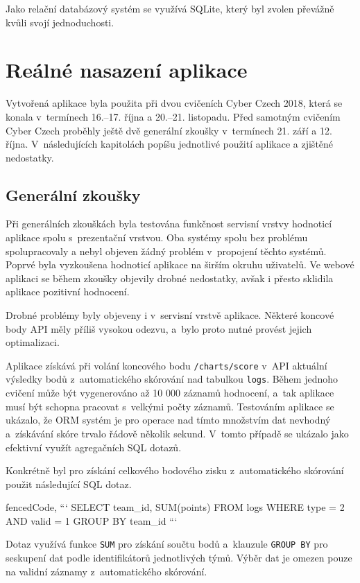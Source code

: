 \documentclass[
  digital,
  twoside,
  table, 
  nolof, 
  nolot
]{fithesis3}
\begin{document}
Jako relační databázový systém se využívá SQLite, který byl zvolen převážně kvůli svojí jednoduchosti.

\section{Reálné nasazení aplikace}

Vytvořená aplikace byla použita při dvou cvičeních Cyber Czech 2018, která se konala v~termínech 16.--17. října a 20.--21. listopadu. Před samotným cvičením Cyber Czech proběhly ještě dvě generální zkoušky v~termínech 21. září a 12. října. V~následujících kapitolách popíšu jednotlivé použití aplikace a zjištěné nedostatky.

\subsection{Generální zkoušky}
Při generálních zkouškách byla testována funkčnost servisní vrstvy hodnoticí aplikace spolu s~prezentační vrstvou. Oba systémy spolu bez problému spolupracovaly a nebyl objeven žádný problém v~propojení těchto systémů. Poprvé byla vyzkoušena hodnoticí aplikace na širším okruhu uživatelů. Ve webové aplikaci se během zkoušky objevily drobné nedostatky, avšak i přesto sklidila aplikace pozitivní hodnocení.

Drobné problémy byly objeveny i v~servisní vrstvě aplikace. Některé koncové body API měly příliš vysokou odezvu, a~bylo proto nutné provést jejich optimalizaci.

Aplikace získává při volání koncového bodu \texttt{/charts/score} v~API aktuální výsledky bodů z~automatického skórování nad tabulkou \texttt{logs}. Během jednoho cvičení může být vygenerováno až 10 000 záznamů hodnocení, a~tak aplikace musí být schopna pracovat s~velkými počty záznamů. Testováním aplikace se ukázalo, že ORM systém je pro operace nad tímto množstvím dat nevhodný a~získávání skóre trvalo řádově několik sekund. V~tomto případě se ukázalo jako efektivní využít agregačních SQL dotazů. 

Konkrétně byl pro získání celkového bodového zisku z~automatického skórování použit následující SQL dotaz.

\begin{markdown*}{%
  fencedCode,
}
```
SELECT team_id, SUM(points) FROM logs 
WHERE type = 2 AND valid = 1 
GROUP BY team_id
```
\end{markdown*}

Dotaz využívá funkce \texttt{SUM} pro získání součtu bodů a~klauzule \texttt{GROUP\ BY} pro seskupení dat podle identifikátorů jednotlivých týmů. Výběr dat je omezen pouze na validní záznamy z~automatického skórování.
\end{document}
